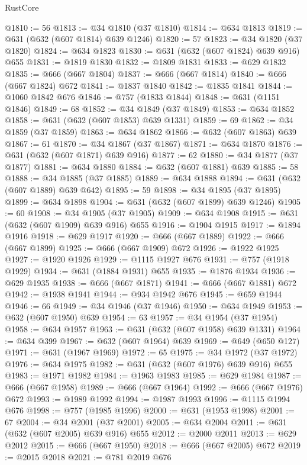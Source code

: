 \begin{lexlean}{RustCore}
\begin{coremodule}
@1810 := 56
@1813 := @34 @1810 (@37 @1810)
@1814 := @634 @1813
@1819 := @631 (@632 (@607 @1814) @639 @1246)
@1820 := 57
@1823 := @34 @1820 (@37 @1820)
@1824 := @634 @1823
@1830 := @631 (@632 (@607 @1824) @639 @916) @655
@1831 := @1819 @1830
@1832 := @1809 @1831
@1833 := @629 @1832
@1835 := @666 (@667 @1804)
@1837 := @666 (@667 @1814)
@1840 := @666 (@667 @1824) @672
@1841 := @1837 @1840
@1842 := @1835 @1841
@1844 := @1060 @1842 @676
@1846 := @757 (@1833 @1844)
@1848 := @631 (@1151 @1846)
@1849 := 68
@1852 := @34 @1849 (@37 @1849)
@1853 := @634 @1852
@1858 := @631 (@632 (@607 @1853) @639 @1331)
@1859 := 69
@1862 := @34 @1859 (@37 @1859)
@1863 := @634 @1862
@1866 := @632 (@607 @1863) @639
@1867 := 61
@1870 := @34 @1867 (@37 @1867)
@1871 := @634 @1870
@1876 := @631 (@632 (@607 @1871) @639 @916)
@1877 := 62
@1880 := @34 @1877 (@37 @1877)
@1881 := @634 @1880
@1884 := @632 (@607 @1881) @639
@1885 := 58
@1888 := @34 @1885 (@37 @1885)
@1889 := @634 @1888
@1894 := @631 (@632 (@607 @1889) @639 @642)
@1895 := 59
@1898 := @34 @1895 (@37 @1895)
@1899 := @634 @1898
@1904 := @631 (@632 (@607 @1899) @639 @1246)
@1905 := 60
@1908 := @34 @1905 (@37 @1905)
@1909 := @634 @1908
@1915 := @631 (@632 (@607 @1909) @639 @916) @655
@1916 := @1904 @1915
@1917 := @1894 @1916
@1918 := @629 @1917
@1920 := @666 (@667 @1889)
@1922 := @666 (@667 @1899)
@1925 := @666 (@667 @1909) @672
@1926 := @1922 @1925
@1927 := @1920 @1926
@1929 := @1115 @1927 @676
@1931 := @757 (@1918 @1929)
@1934 := @631 (@1884 @1931) @655
@1935 := @1876 @1934
@1936 := @629 @1935
@1938 := @666 (@667 @1871)
@1941 := @666 (@667 @1881) @672
@1942 := @1938 @1941
@1944 := @934 @1942 @676
@1945 := @659 @1944
@1946 := 66
@1949 := @34 @1946 (@37 @1946)
@1950 := @634 @1949
@1953 := @632 (@607 @1950) @639
@1954 := 63
@1957 := @34 @1954 (@37 @1954)
@1958 := @634 @1957
@1963 := @631 (@632 (@607 @1958) @639 @1331)
@1964 := @634 @399
@1967 := @632 (@607 @1964) @639
@1969 := @649 (@650 @127)
@1971 := @631 (@1967 @1969)
@1972 := 65
@1975 := @34 @1972 (@37 @1972)
@1976 := @634 @1975
@1982 := @631 (@632 (@607 @1976) @639 @916) @655
@1983 := @1971 @1982
@1984 := @1963 @1983
@1985 := @629 @1984
@1987 := @666 (@667 @1958)
@1989 := @666 (@667 @1964)
@1992 := @666 (@667 @1976) @672
@1993 := @1989 @1992
@1994 := @1987 @1993
@1996 := @1115 @1994 @676
@1998 := @757 (@1985 @1996)
@2000 := @631 (@1953 @1998)
@2001 := 67
@2004 := @34 @2001 (@37 @2001)
@2005 := @634 @2004
@2011 := @631 (@632 (@607 @2005) @639 @916) @655
@2012 := @2000 @2011
@2013 := @629 @2012
@2015 := @666 (@667 @1950)
@2018 := @666 (@667 @2005) @672
@2019 := @2015 @2018
@2021 := @781 @2019 @676

\end{coremodule}
\end{lexlean}
